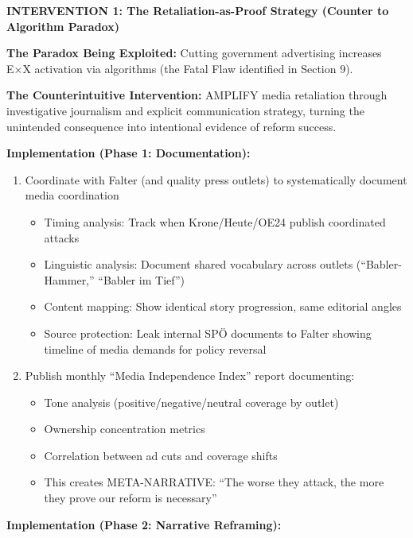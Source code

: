 \vspace{0.5cm}

\textbf{INTERVENTION 1: The Retaliation-as-Proof Strategy (Counter to Algorithm Paradox)}

\textbf{The Paradox Being Exploited:} Cutting government advertising increases E×X activation via algorithms
(the Fatal Flaw identified in Section 9).

\textbf{The Counterintuitive Intervention:} AMPLIFY media retaliation through investigative journalism and explicit
communication strategy, turning the unintended consequence into intentional evidence of reform success.

\textbf{Implementation (Phase 1: Documentation):}

\begin{enumerate}
\item Coordinate with Falter (and quality press outlets) to systematically document media coordination
  \begin{itemize}
  \item Timing analysis: Track when Krone/Heute/OE24 publish coordinated attacks
  \item Linguistic analysis: Document shared vocabulary across outlets (``Babler-Hammer,'' ``Babler im Tief'')
  \item Content mapping: Show identical story progression, same editorial angles
  \item Source protection: Leak internal SPÖ documents to Falter showing timeline of media demands for policy reversal
  \end{itemize}

\item Publish monthly ``Media Independence Index'' report documenting:
  \begin{itemize}
  \item Tone analysis (positive/negative/neutral coverage by outlet)
  \item Ownership concentration metrics
  \item Correlation between ad cuts and coverage shifts
  \item This creates META-NARRATIVE: ``The worse they attack, the more they prove our reform is necessary''
  \end{itemize}
\end{enumerate}

\textbf{Implementation (Phase 2: Narrative Reframing):}

